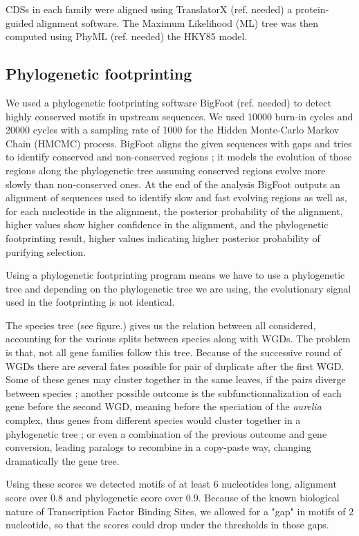 CDSs in each family were aligned using TranslatorX (ref. needed) a protein-guided alignment software. The Maximum Likelihood (ML) tree was then computed using PhyML (ref. needed) the HKY85 model.

\subsection*{Phylogenetic footprinting}

We used a phylogenetic footprinting software BigFoot (ref. needed) to detect highly conserved motifs in upstream sequences. We used 10000 burn-in cycles and 20000 cycles with a sampling rate of 1000 for the Hidden Monte-Carlo Markov Chain (HMCMC) process. BigFoot aligns the given sequences with gaps and tries to identify conserved and non-conserved regions ; it models the evolution of those regions along the phylogenetic tree assuming conserved regions evolve more slowly than non-conserved ones. At the end of the analysis BigFoot outputs an alignment of sequences used to identify slow and fast evolving regions as well as, for each nucleotide in the alignment, the posterior probability of the alignment, higher values show higher confidence in the alignment, and the phylogenetic footprinting result, higher values indicating higher posterior probability of purifying selection.

Using a phylogenetic footprinting program means we have to use a phylogenetic tree and depending on the phylogenetic tree we are using, the evolutionary signal used in the footprinting is not identical.

The species tree (see figure.) gives us the relation between all considered, accounting for the various splits between species along with WGDs. The problem is that, not all gene families follow this tree. Because of the successive round of WGDs there are several fates possible for pair of duplicate after the first WGD. Some of these genes may cluster together in the same leaves, if the pairs diverge between species ; another possible outcome is the subfunctionnalization of each gene before the second WGD, meaning before the speciation of the \textit{aurelia} complex, thus genes from different species would cluster together in a phylogenetic tree ; or even a combination of the previous outcome and gene conversion, leading paralogs to recombine in a copy-paste way, changing dramatically the gene tree.

Using these scores we detected motifs of at least 6 nucleotides long, alignment score over 0.8 and phylogenetic score over 0.9. Because of the known biological nature of Transcription Factor Binding Sites, we allowed for a "gap" in motifs of 2 nucleotide, so that the scores could drop under the thresholds in those gaps.

